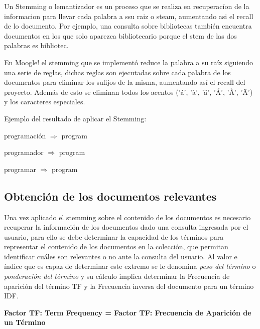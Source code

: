 \documentclass[a4paper,12pt]{article}
\begin{document}
	Un Stemming o lemantizador es un proceso que se realiza en recuperacíon de la informacion para llevar cada palabra a ssu raiz o steam, aumentando asi el recall de lo documento. Por ejemplo, una consulta sobre bibliotecas también encuentra documentos en los que solo aparezca bibliotecario porque el stem de las dos palabras es bibliotec.
	
	En Moogle! el stemming que se implementó reduce la palabra a su raíz siguiendo una serie de reglas, dichas reglas son ejecutadas sobre cada palabra de los documentos para eliminar los sufijos de la misma, aumentando así el recall del proyecto. Además de esto se eliminan todos los acentos ('á', 'à', 'ä', 'Á', 'À', 'Ä') y los caracteres especiales.
	
	\vspace{0.5cm}
	
	Ejemplo del resultado de aplicar el Stemming:
	
	\vspace{0.3cm}
	
	\begin{center}
		programación $\Rightarrow$ program
	
		programador $\Rightarrow$ program
	
		programar $\Rightarrow$ program
	\end{center}

	\subsection{Obtención de los documentos relevantes}\label{sub:obtencion}
	
	Una vez aplicado el stemming sobre el contenido de los documentos es necesario recuperar la información de los documentos dado una consulta ingresada por el usuario, para ello se debe determinar la capacidad de los términos para representar el contenido de los documentos en la colección, que permitan identificar cuáles son relevantes o no ante la consulta del usuario. Al valor e índice que es capaz de determinar este extremo se le denomina \emph{peso del término}  o \emph{ponderación del término} y su cálculo implica determinar la Frecuencia de aparición del término TF y la Frecuencia inversa del documento para un término IDF.
	
	\vspace{0.3cm}
	
	\textbf {Factor TF: Term Frequency = Factor TF: Frecuencia de Aparición de un Término} 
	
	\vspace{0.3cm}
	
\end{document}
